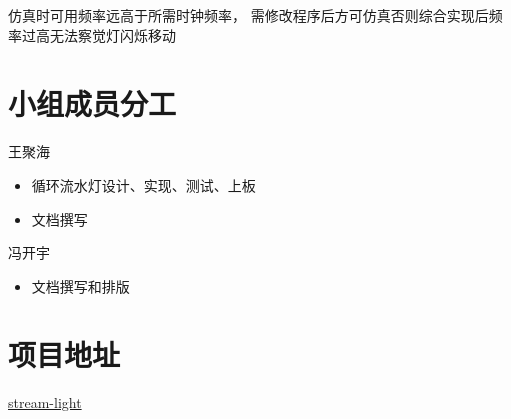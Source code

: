 \documentclass[UTF8]{article}
\begin{document}
仿真时可用频率远高于所需时钟频率，
需修改程序后方可仿真否则综合实现后频率过高无法察觉灯闪烁移动
\section{小组成员分工}

王聚海
\begin{itemize}
    \item 循环流水灯设计、实现、测试、上板
    \item 文档撰写
\end{itemize}

冯开宇
\begin{itemize}
    \item 文档撰写和排版
\end{itemize}

\section{项目地址}

\href{https://github.com/bit-logic-computer-design-2019/stream-light}{stream-light}
\end{document}

